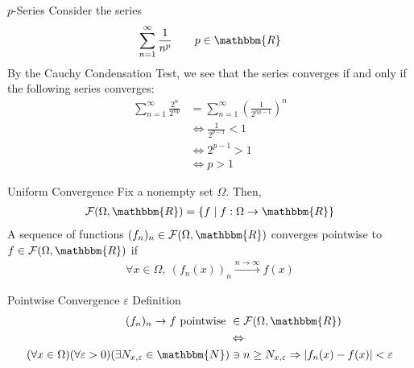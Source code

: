 \documentclass[10pt]{extarticle}
\newcommand{\N}{\mathbbm{N}}
\newcommand{\R}{\mathbbm{R}}
\begin{document}
  \begin{problem}{$p$-Series}
    Consider the series
    \begin{align*}
      \sum_{n=1}^{\infty}\frac{1}{n^p} \tag*{$p\in\R$}
    \end{align*}
    By the Cauchy Condensation Test, we see that the series converges if and only if the following series converges:
    \begin{align*}
      \sum_{n=1}^{\infty}\frac{2^n}{2^{np}} &= \sum_{n=1}^{\infty}\left(\frac{1}{2^{np-1}}\right)^n\\
                                            &\Leftrightarrow \frac{1}{2^{p-1}} < 1\\
                                            &\Leftrightarrow 2^{p-1} > 1\\
                                            &\Leftrightarrow p > 1
    \end{align*}
  \end{problem}
  \begin{problem}{Uniform Convergence}
    Fix a nonempty set $\Omega$. Then,
    \begin{align*}
      \mathcal{F}(\Omega,\R) = \left\{f\mid f: \Omega \rightarrow \R\right\}
    \end{align*}
    A sequence of functions $(f_n)_n\in \mathcal{F}(\Omega,\R)$ converges pointwise to $f\in \mathcal{F}(\Omega,\R)$ if
    \begin{align*}
      \forall x\in\Omega,~(f_n(x))_n \xrightarrow{n\rightarrow\infty}f(x)
    \end{align*}
  \end{problem}
  \begin{problem}{Pointwise Convergence $\varepsilon$ Definition}
    \begin{align*}
      (f_n)_n \rightarrow f \text{ pointwise } &\in \mathcal{F}(\Omega,\R)\\
                                               &\Leftrightarrow\\
      (\forall x\in\Omega)(\forall \varepsilon > 0) (\exists N_{x,\varepsilon}\in\N) &\ni n\geq N_{x,\varepsilon} \Rightarrow \left|f_n(x) - f(x)\right| < \varepsilon
    \end{align*}
  \end{problem}
\end{document}
